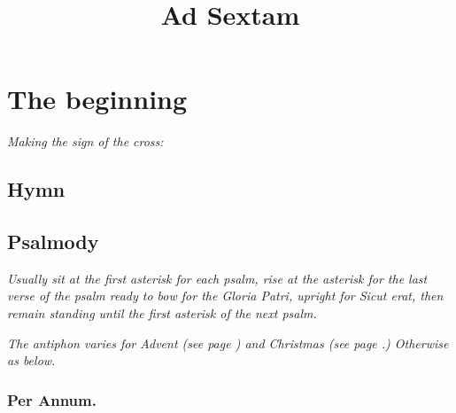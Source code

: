 \documentclass[a5paper,12pt,twoside,openany]{memoir}
\title{Ad Sextam}
\renewcommand\Vbar{\makebox[1em][l]{\versicles v}}
\renewcommand\Rbar{\makebox[1em][l]{\versicles r}}
\newcommand\rubrics[1]{\textit{#1}}
\begin{document}
\nouppercaseheads
\pagestyle{myheadings}



\setcounter{secnumdepth}{0}


\maketitle

\tableofcontents

\chapter{The beginning}
\label{beginning}

\bigskip

\rubrics{Making the sign of the cross:}


\bigskip





\section{Hymn}





\section{Psalmody}

\rubrics{Usually sit at the first asterisk for each psalm, rise at the asterisk for the last verse of the psalm ready to bow for the \emph{Gloria Patri}, upright for \emph{Sicut erat}, then remain standing until the first asterisk of the next psalm.}

\rubrics{The antiphon varies for Advent (see page \pageref{missusest}) and Christmas (see page \pageref{oadmirabile}.) Otherwise as below.}

\subsection{Per Annum.}
\end{document}
